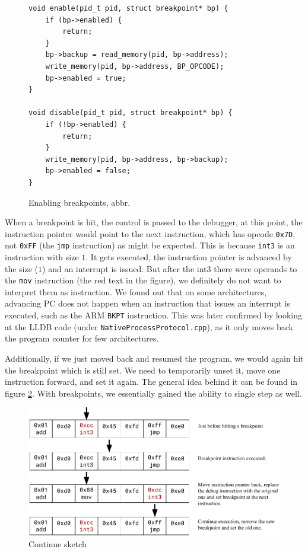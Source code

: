 \begin{figure}
    \begin{verbatim}
void enable(pid_t pid, struct breakpoint* bp) {
    if (bp->enabled) {
        return;
    }
    bp->backup = read_memory(pid, bp->address);
    write_memory(pid, bp->address, BP_OPCODE);
    bp->enabled = true;
}

void disable(pid_t pid, struct breakpoint* bp) {
    if (!bp->enabled) {
        return;
    }
    write_memory(pid, bp->address, bp->backup);
    bp->enabled = false;
}
    \end{verbatim}
    \caption{Enabling breakpoints, abbr.}
    \label{fig:breakpoint-enable}
\end{figure}

When a breakpoint is hit, the control is passed to the debugger, at this point,
the instruction pointer would point to the next instruction, which has opcode
\texttt{0x7D}, not \texttt{0xFF} (the \texttt{jmp} instruction) as might be
expected. This is because \texttt{int3} is an instruction with size $1$. It
gets executed, the instruction pointer is advanced by the size ($1$) and an
interrupt is issued. But after the int3 there were operands to the \texttt{mov}
instruction (the red text in the figure), we definitely do not want to
interpret them as instruction. We found out that on some architectures,
advancing PC does not happen when an instruction that issues an interrupt is
executed, such as the ARM \texttt{BKPT} instruction. This was later confirmed
by looking at the LLDB code (under
\verb|NativeProcessProtocol.cpp|), as it only moves back
the program counter for few architectures.

Additionally, if we just moved back and resumed the program, we would again hit
the breakpoint which is still set. We need to temporarily unset it, move one
instruction forward, and set it again. The general idea behind it can be found
in figure \ref{fig:continue}. With breakpoints, we essentially gained the
ability to single step as well.

\begin{figure}
    \centering
    \includegraphics[scale=0.5]{media/DIAGRAM}
    \caption{Continue sketch}
    \label{fig:continue}
\end{figure}

